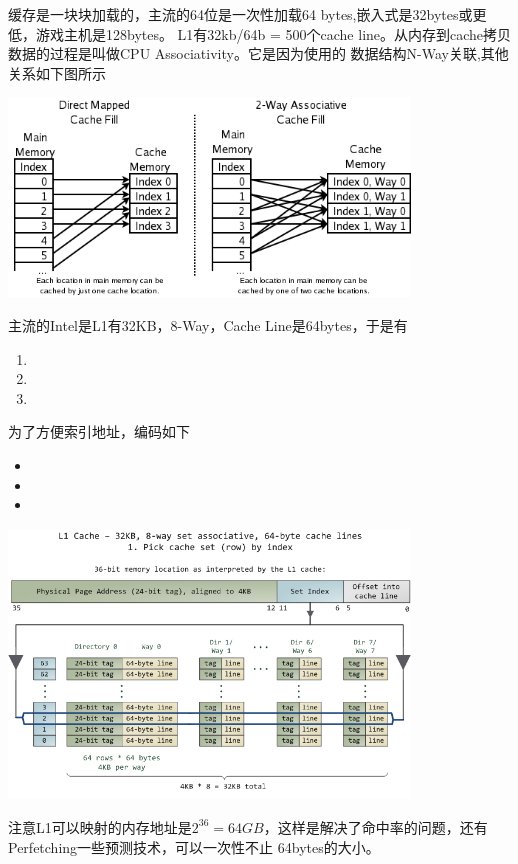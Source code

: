 缓存是一块块加载的，主流的64位是一次性加载64 bytes,嵌入式是32bytes或更低，游戏主机是128bytes。
L1有32kb/64b = 500个cache line。从内存到cache拷贝数据的过程是叫做CPU Associativity。它是因为使用的
数据结构N-Way关联,其他关系如下图所示
\begin{center}
    \includegraphics[width=0.8\textwidth]{images/cache-associative-fill-both.png}
\end{center}
主流的Intel是L1有32KB，8-Way，Cache Line是64bytes，于是有
\begin{enumerate}
    \item {}
    \item {}
    \item {}
\end{enumerate}
为了方便索引地址，编码如下
\begin{itemize}
    \item {}
    \item {}
    \item {}
\end{itemize}
\begin{center}
    \includegraphics[width=0.8\textwidth]{images/L1CacheExample.png}
\end{center}
注意L1可以映射的内存地址是$2^36=64GB$，这样是解决了命中率的问题，还有Perfetching一些预测技术，可以一次性不止
64bytes的大小。

